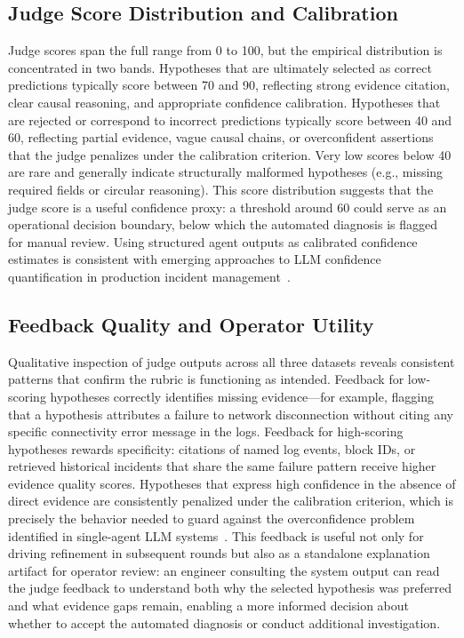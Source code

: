 \subsection{Judge Score Distribution and Calibration}

Judge scores span the full range from 0 to 100, but the empirical distribution is concentrated in
two bands. Hypotheses that are ultimately selected as correct predictions typically score between
70 and 90, reflecting strong evidence citation, clear causal reasoning, and appropriate confidence
calibration. Hypotheses that are rejected or correspond to incorrect predictions typically score
between 40 and 60, reflecting partial evidence, vague causal chains, or overconfident assertions
that the judge penalizes under the calibration criterion. Very low scores below 40 are rare and
generally indicate structurally malformed hypotheses (e.g., missing required fields or circular
reasoning). This score distribution suggests that the judge score is a useful confidence proxy:
a threshold around 60 could serve as an operational decision boundary, below which the automated
diagnosis is flagged for manual review. Using structured agent outputs as calibrated confidence
estimates is consistent with emerging approaches to LLM confidence quantification in production
incident management~\cite{chen2024rcacopilot,roy2024llmagentRCA}.

\subsection{Feedback Quality and Operator Utility}

Qualitative inspection of judge outputs across all three datasets reveals consistent patterns that
confirm the rubric is functioning as intended. Feedback for low-scoring hypotheses correctly
identifies missing evidence---for example, flagging that a hypothesis attributes a failure to
network disconnection without citing any specific connectivity error message in the logs. Feedback
for high-scoring hypotheses rewards specificity: citations of named log events, block IDs, or
retrieved historical incidents that share the same failure pattern receive higher evidence quality
scores. Hypotheses that express high confidence in the absence of direct evidence are consistently
penalized under the calibration criterion, which is precisely the behavior needed to guard against
the overconfidence problem identified in single-agent LLM systems~\cite{chen2024rcacopilot}. This
feedback is useful not only for driving refinement in subsequent rounds but also as a standalone
explanation artifact for operator review: an engineer consulting the system output can read the
judge feedback to understand both why the selected hypothesis was preferred and what evidence gaps
remain, enabling a more informed decision about whether to accept the automated diagnosis or
conduct additional investigation.

